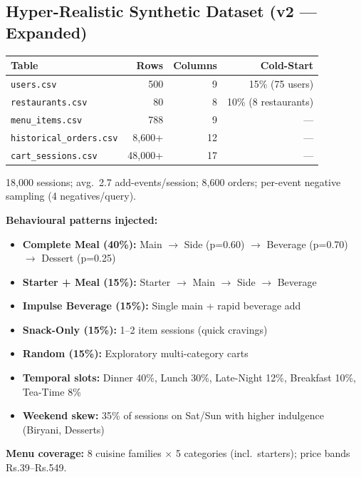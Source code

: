 \documentclass[11pt,a4paper]{article}
\newcommand{\TO}{$\rightarrow$}
\begin{document}
\subsection{Hyper-Realistic Synthetic Dataset (v2 --- Expanded)}

{\small
\begin{center}
\begin{tabular}{lrrr}
  \toprule
  \textbf{Table} & \textbf{Rows} & \textbf{Columns} & \textbf{Cold-Start} \\
  \midrule
  \texttt{users.csv}              & 500      & 9  & 15\% (75 users) \\
  \texttt{restaurants.csv}        & 80       & 8  & 10\%  (8 restaurants) \\
  \texttt{menu\_items.csv}        & 788      & 9  & --- \\
  \texttt{historical\_orders.csv} & 8{,}600+ & 12 & --- \\
  \texttt{cart\_sessions.csv}     & 48{,}000+& 17 & --- \\
  \bottomrule
\end{tabular}
\end{center}
}
\smallskip
{\small 18{,}000 sessions; avg.\ 2.7 add-events/session; 8{,}600 orders; per-event negative sampling (4 negatives/query).}

\medskip
\textbf{Behavioural patterns injected:}
\begin{itemize}[noitemsep, leftmargin=*]
  \item \textbf{Complete Meal (40\%):}
    Main \TO{} Side (p=0.60) \TO{} Beverage (p=0.70) \TO{} Dessert (p=0.25)
  \item \textbf{Starter + Meal (15\%):}
    Starter \TO{} Main \TO{} Side \TO{} Beverage
  \item \textbf{Impulse Beverage (15\%):} Single main + rapid beverage add
  \item \textbf{Snack-Only (15\%):} 1--2 item sessions (quick cravings)
  \item \textbf{Random (15\%):} Exploratory multi-category carts
  \item \textbf{Temporal slots:}
    Dinner 40\%, Lunch 30\%, Late-Night 12\%, Breakfast 10\%, Tea-Time 8\%
  \item \textbf{Weekend skew:} 35\% of sessions on Sat/Sun with higher
    indulgence (Biryani, Desserts)
\end{itemize}

\textbf{Menu coverage:} 8 cuisine families $\times$ 5 categories
(incl.\ starters); price bands Rs.39--Rs.549.
\end{document}
